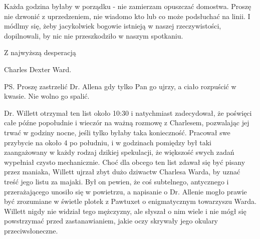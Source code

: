 \begin{displayquote}
Każda godzina byłaby w porządku - nie zamierzam opuszczać domostwa. Proszę nie dzwonić z uprzedzeniem, nie wiadomo kto lub co może podsłuchać na linii. I módlmy się, żeby jacykolwiek bogowie istnieją w naszej rzeczywistości, dopilnowali, by nic nie przeszkodziło w naszym spotkaniu.

Z najwyższą desperacją

\begin{flushright}
Charles Dexter Ward.
\end{flushright}

PS. Proszę zastrzelić Dr. Allena gdy tylko Pan go ujrzy, a ciało rozpuścić w kwasie. Nie wolno go spalić.
\end{displayquote}

Dr. Willett otrzymał ten list około 10:30 i natychmiast zadecydował, że poświęci całe późne popołudnie i wieczór na ważną rozmowę z Charlesem, pozwalając jej trwać w godziny nocne, jeśli tylko byłaby taka konieczność. Pracował swe przybycie na około 4 po południu, i w godzinach pomiędzy był taki zaangażowany w każdy rodzaj dzikiej spekulacji, że większość swych zadań wypełniał czysto mechanicznie. Choć dla obcego ten list zdawał się być pisany przez maniaka, Willett ujrzał zbyt dużo dziwactw Charlesa Warda, by uznać treść jego listu za majaki. Był on pewien, że coś subtelnego, antycznego i przerażającego unosiło się w powietrzu, a napisanie o Dr. Allenie mogło prawie być zrozumiane w świetle plotek z Pawtuxet o enigmatycznym towarzyszu Warda. Willett nigdy nie widział tego mężczyzny, ale słyszał o nim wiele i nie mógł się powstrzymać przed zastanawianiem, jakie oczy skrywały jego okulary przeciwsłoneczne. 

